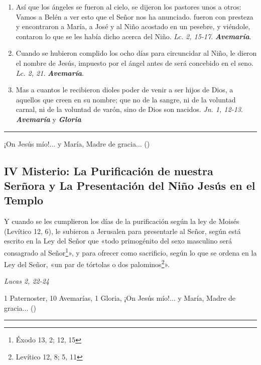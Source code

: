 \documentclass[./rosary.tex]{subfiles}
\begin{document}
\begin{enumerate}
      \item Así que los ángeles se fueron al cielo, se dijeron los pastores unos a otros: Vamos a Belén a ver esto que el Señor nos ha anunciado. fueron
            con presteza y encontraron a María, a José y al Niño acostado en un pesebre, y viéndole, contaron lo que se les había dicho acerca del
            Niño. \emph{Lc. 2, 15-17}. \textbf{\emph{Avemaría}}.


      \item Cuando se hubieron complido los ocho días para circuncidar al Niño, le dieron el nombre de Jesús, impuesto por el ángel antes de será concebido en el seno.
            \emph{Lc. 2, 21}. \textbf{\emph{Avemaría}}.

      \item Mas a cuantos le recibieron dioles poder de venir a ser hijos de Dios, a aquellos que creen en su nombre; que no de la sangre, ni de la voluntad carnal,
            ni de la voluntad de varón, sino de Dios son nacidos. \emph{Jn. 1, 12-13}. \textbf{\emph{Avemaría}} y \textbf{\emph{Gloria}}
\end{enumerate}

\rule{\textwidth}{0.5pt}
¡On Jesús mío!... y María, Madre de gracia... ()

\subsection*{IV Misterio: La Purificación de nuestra Serñora y La Presentación del Niño Jesús en el Templo}

Y cuando se les cumplieron los días de la purificación según la ley de Moisés (Levítico 12, 6),
le subieron a Jerusalen para presentarle al Señor, según está escrito en la Ley del Señor que «todo primogénito
del sexo masculino será consagrado al Señor\footnote{Éxodo 13, 2; 12, 15\label{primogenito}}», y para ofrecer como sacrificio,
según lo que se ordena en la Ley del Señor, «un par de tórtolas o dos palominos\footnote{Levítico 12, 8; 5, 11\label{sacrificio}}».
\begin{flushright}
      \emph{Lucas 2, 22-24}
\end{flushright}

1 Paternoster, 10 Avemarías, 1 Gloria, ¡On Jesús mío!... y María, Madre de gracia... ()

\rule{\textwidth}{0.5pt}
\end{document}
